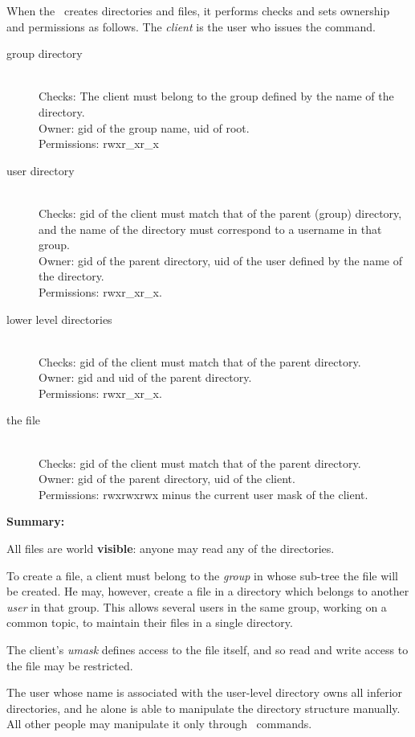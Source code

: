 When the \DPM\ creates directories and files, it performs checks and sets
 ownership
and permissions as follows. The {\it client} is the user who issues the command.
\begin{description}
\item[group directory] ~\\
Checks: The client must belong to the group defined by the name of the
 directory.\\
Owner: gid of the group name, uid of root.\\ Permissions: rwxr\_xr\_x
\item[user directory] ~\\
Checks: gid of the client must match that of the parent (group) directory,
and the name of the directory must correspond to a username in that group.\\
Owner: gid of the parent directory, uid of the user defined by the name of the
 directory.\\
Permissions: rwxr\_xr\_x.
\item[lower level directories] ~\\
Checks: gid of the client must match that of the parent directory.\\
Owner: gid and uid of the parent directory.\\
Permissions: rwxr\_xr\_x.\\
\item[the file] ~\\
Checks: gid of the client must match that of the parent directory.\\
Owner: gid of the parent directory, uid of the client.\\
Permissions: rwxrwxrwx minus the current user mask of the client.
\end{description}
 
{\bf Summary:}
 
All files are world {\bf visible}: anyone may read any of the
directories.
 
To create a file, a client must belong to the {\it group} in whose sub-tree the
 file
will be created. He may, however, create a file in a directory
which belongs to another {\it user} in that group. This allows several users
in the same group, working on a common topic, to maintain their files in
a single directory.
 
The client's {\it umask} defines access to the file itself, and so
read and write access to the file may be restricted.
 
The user whose name is associated with
the user-level directory owns all inferior directories, and he alone is able to
 manipulate
the directory structure manually. All other people may manipulate it only
 through \DPM\
commands.
 
